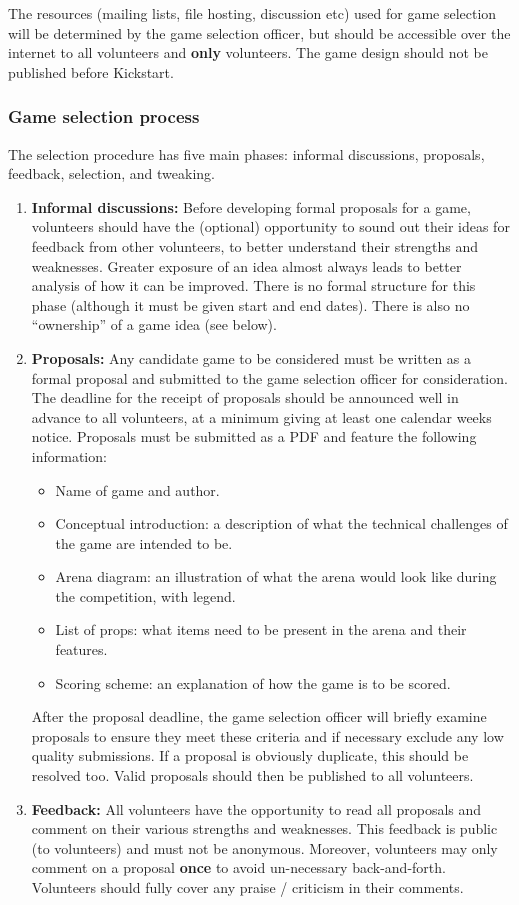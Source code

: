 The resources (mailing lists, file hosting, discussion etc) used for game
selection will be determined by the game selection officer, but should be
accessible over the internet to all volunteers and \textbf{only} volunteers.
The game design should not be published before Kickstart.

\subsubsection{Game selection process}

The selection procedure has five main phases: informal discussions, proposals,
feedback, selection, and tweaking.

\begin{enumerate}
	\item \textbf{Informal discussions:} Before developing formal proposals
		for a game, volunteers should have the (optional) opportunity
		to sound out their ideas for feedback from other volunteers,
		to better understand their strengths and weaknesses. Greater
		exposure of an idea almost always leads to better analysis of
		how it can be improved. There is no formal structure for this
		phase (although it must be given start and end dates). There is
		also no ``ownership'' of a game idea (see below).
	\item \textbf{Proposals:} Any candidate game to be considered must be
		written as a formal proposal and submitted to the game
		selection officer for consideration. The deadline for the
		receipt of proposals should be announced well in advance to
		all volunteers, at a minimum giving at least one calendar weeks
		notice. Proposals must be submitted as a PDF and feature the
		following information:
		\begin{itemize}
			\item Name of game and author.
			\item Conceptual introduction: a description of what
				the technical challenges of the game are
				intended to be.
			\item Arena diagram: an illustration of what the arena
				would look like during the competition, with
				legend.
			\item List of props: what items need to be present
				in the arena and their features.
			\item Scoring scheme: an explanation of how the game
				is to be scored.
		\end{itemize}
		After the proposal deadline, the game selection officer will
		briefly examine proposals to ensure they meet these criteria
		and if necessary exclude any low quality submissions. If a
		proposal is obviously duplicate, this should be resolved too.
		Valid proposals should then be published to all volunteers.
	\item \textbf{Feedback:} All volunteers have the opportunity to read
		all proposals and comment on their various strengths and
		weaknesses. This feedback is public (to volunteers) and must
		not be anonymous. Moreover, volunteers may only comment on a
		proposal \textbf{once} to avoid un-necessary back-and-forth.
		Volunteers should fully cover any praise / criticism in their
		comments.


\end{enumerate}
